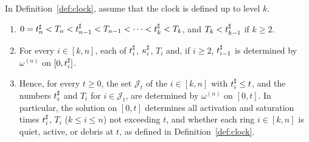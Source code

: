 \begin{lemma}
\label{lem:clock}
In Definition~\ref{def:clock}, assume that the clock is defined up to level $k$.
\begin{enumerate}[label=\textup{(\arabic*)}]
\item $0=t^\sharp_n<T_n<t^\sharp_{n-1}<T_{n-1}<\dots<t^\sharp_k<T_k$, and $T_k<t^\sharp_{k-1}$
  if $k\ge2$.
\item For every $i\in[k,n]$, each of $t^\sharp_i$, $\kappa^\sharp_i$, $T_i$ and, if $i\ge2$,
  $t^\sharp_{i-1}$ is determined by $\omega^{(n)}$ on $[0,t^\sharp_i]$.
\item Hence, for every $t\ge0$, the set $\mathcal J_t$ of the $i\in[k,n]$ with
  $t^\sharp_i\le t$, and the numbers $t^\sharp_i$ and $T_i$ for $i\in\mathcal J_t$, are
  determined by $\omega^{(n)}$ on $[0,t]$. In particular, the solution on
  $[0,t]$ determines all activation and saturation times $t^\sharp_i$, $T_i$
  ($k\le i\le n$) not exceeding $t$, and whether each ring $i\in[k,n]$ is
  quiet, active, or debris at $t$, as defined in Definition~\ref{def:clock}.
\end{enumerate}
\end{lemma}
